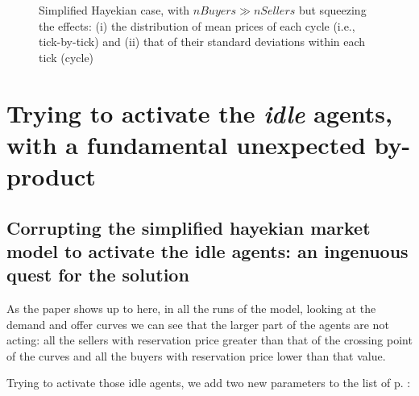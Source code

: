 \documentclass[10pt]{report}
\begin{document}
\begin{appendices}
\begin{figure}[H]
\begin{center}
\caption{Simplified Hayekian case, with $nBuyers \gg nSellers$ but squeezing the effects: (i) the distribution of mean prices of each cycle (i.e., tick-by-tick) and (ii) that of their standard deviations within each tick (cycle)}
\label{output_3_3bbb.png}
\end{center}
\end{figure}


\chapter{Trying to activate the \emph{idle} agents, with a fundamental unexpected by-product}\label{Activating idle agents}
\thispagestyle{fancy}

\section{Corrupting the simplified hayekian market model to activate the idle agents: an ingenuous quest for the solution}

As the paper shows up to here, in all the runs of the model, looking at the demand and offer curves we can see that the larger part of the agents are not acting: all the sellers with reservation price greater than that of the crossing point of the curves and all the buyers with reservation price lower than that value.

Trying to activate those idle agents, we add two new parameters to the list of p. \pageref{parameters}:


\end{appendices}
\end{document}
